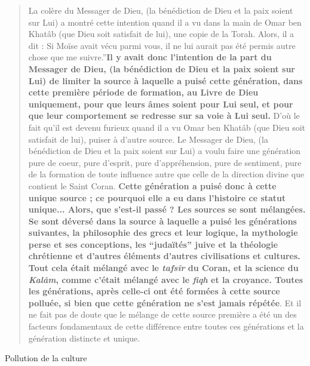 \begin{quote}
La colère du Messager de Dieu, (la bénédiction de Dieu et la paix soient
sur Lui) a montré cette intention quand il a vu dans la main de Omar ben
Khatâb (que Dieu soit satisfait de lui), une copie de la Torah. Alors,
il a dit : Si Moïse avait vécu parmi vous, il ne lui aurait pas été
permis autre chose que me suivre.''\textbf{Il y avait donc l'intention
de la part du Messager de Dieu, (la bénédiction de Dieu et la paix
soient sur Lui) de limiter la source à laquelle a puisé cette
génération, dans cette première période de formation, au Livre de Dieu
uniquement, pour que leurs âmes soient pour Lui seul, et pour que leur
comportement se redresse sur sa voie à Lui seul.} D'où le fait qu'il est
devenu furieux quand il a vu Omar ben Khatâb (que Dieu soit satisfait de
lui), puiser à d'autre source. Le Messager de Dieu, (la bénédiction de
Dieu et la paix soient sur Lui) a voulu faire une génération pure de
coeur, pure d'esprit, pure d'appréhension, pure de sentiment, pure de la
formation de toute influence autre que celle de la direction divine que
contient le Saint Coran. \textbf{Cette génération a puisé donc à cette
unique source ; ce pourquoi elle a eu dans l'histoire ce statut
unique... Alors, que s'est-il passé ? Les sources se sont mélangées. Se
sont déversé dans la source à laquelle a puisé les générations
suivantes, la philosophie des grecs et leur logique, la mythologie perse
et ses conceptions, les ``judaïtés'' juive et la théologie chrétienne et
d'autres éléments d'autres civilisations et cultures. Tout cela était
mélangé avec le \emph{tafsîr} du Coran, et la science du \emph{Kalâm},
comme c'était mélangé avec le \emph{fiqh} et la croyance. Toutes les
générations, après celle-ci ont été formées à cette source polluée, si
bien que cette génération ne s'est jamais répétée}. Et il ne fait pas de
doute que le mélange de cette source première a été un des facteurs
fondamentaux de cette différence entre toutes ces générations et la
génération distincte et unique.

\end{quote}
\begin{Synthesis}
Pollution de la culture
\end{Synthesis}

